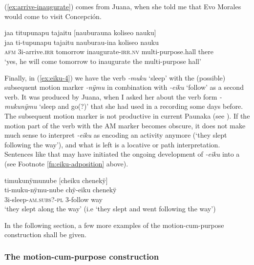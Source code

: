 (\ref{ex:arrive-inaugurate}) comes from Juana, when she told me that Evo Morales would come to visit Concepción.

\ea\label{ex:arrive-inaugurate}
\begingl
\glpreamble jaa titupunapu tajaitu \textup{[}nauburauna koliseo nauku\textup{]}\\
\gla jaa ti-tupunapu tajaitu nauburau-ina koliseo nauku\\
\glb \textsc{afm} 3i-arrive.\textsc{irr} tomorrow inaugurate-\textsc{irr.nv} multi-purpose.hall there\\
\glft ‘yes, he will come tomorrow to inaugurate the multi-purpose hall’
\endgl
\trailingcitation{[jxx-p150920l.013]}
\xe

Finally, in (\ref{ex:eiku-4}) we have the verb \textit{-muku} ‘sleep’ with the (possible) subsequent motion marker \textit{-nÿmu} in combination with \textit{-eiku} ‘follow’ as a second verb. It was produced by Juana, when I asked her about the verb form \textit{-mukunÿmu} ‘sleep and go(?)’ that she had used in a recording some days before. The subsequent motion marker is not productive in current Paunaka (see ). If the motion part of the verb with the AM marker becomes obscure, it does not make much sense to interpret \textit{-eiku} as encoding an activity anymore (‘they slept following the way’), and what is left is a locative or path interpretation. Sentences like that may have initiated the ongoing development of \textit{-eiku} into a  (see Footnote \ref{fn:eiku-adposition} above).

\ea\label{ex:eiku-4}
\begingl
\glpreamble timukunÿmunube \textup{[}cheiku chenekÿ\textup{]}\\
\gla ti-muku-nÿmu-nube chÿ-eiku chenekÿ\\
\glb 3i-sleep-\textsc{am.subs}?-\textsc{pl} 3-follow way\\
\glft ‘they slept along the way’ (i.e ‘they slept and went following the way’)
\endgl
\trailingcitation{[jxx-p151016l-2.007]}
\xe


 In the following section, a few more examples of the motion-cum-purpose construction shall be given.


\subsubsection{The motion-cum-purpose construction}\label{sec:MotionCumPurpose}

